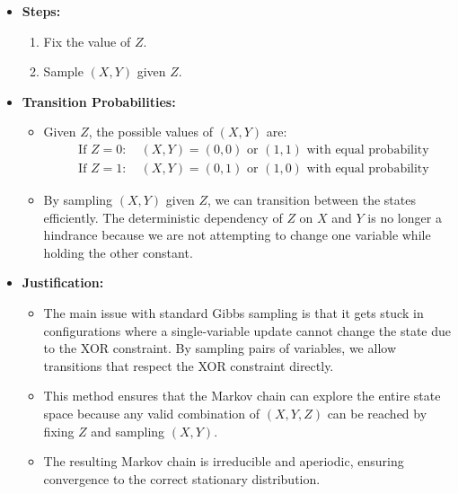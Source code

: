 \documentclass[a4 paper]{article}
\begin{document}
\begin{enumerate}
\begin{itemize}
        \item \textbf{Steps:}
        \begin{enumerate}
            \item Fix the value of \( Z \).
            \item Sample \( (X, Y) \) given \( Z \).
        \end{enumerate}

        \item \textbf{Transition Probabilities:}
        \begin{itemize}
            \item Given \( Z \), the possible values of \( (X, Y) \) are:
            \[
            \begin{aligned}
                &\text{If } Z = 0: \quad (X, Y) = (0, 0) \text{ or } (1, 1) \text{ with equal probability} \\
                &\text{If } Z = 1: \quad (X, Y) = (0, 1) \text{ or } (1, 0) \text{ with equal probability}
            \end{aligned}
            \]

            \item By sampling \( (X, Y) \) given \( Z \), we can transition between the states efficiently. The deterministic dependency of \( Z \) on \( X \) and \( Y \) is no longer a hindrance because we are not attempting to change one variable while holding the other constant.
        \end{itemize}

        \item \textbf{Justification:}
        \begin{itemize}
            \item The main issue with standard Gibbs sampling is that it gets stuck in configurations where a single-variable update cannot change the state due to the XOR constraint. By sampling pairs of variables, we allow transitions that respect the XOR constraint directly.
            \item This method ensures that the Markov chain can explore the entire state space because any valid combination of \( (X, Y, Z) \) can be reached by fixing \( Z \) and sampling \( (X, Y) \).
            \item The resulting Markov chain is irreducible and aperiodic, ensuring convergence to the correct stationary distribution.
        \end{itemize}
    \end{itemize}






\end{enumerate}
\end{document}
